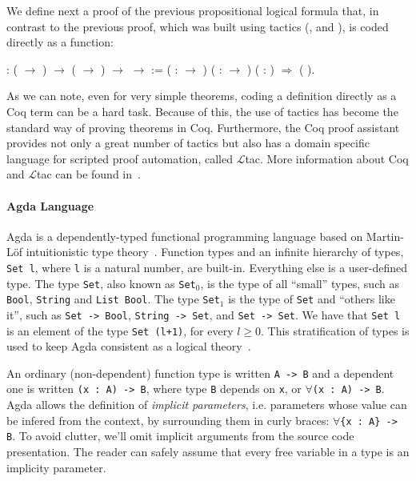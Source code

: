 We define next a proof of the previous propositional logical formula
that, in contrast to the previous proof, which was built using tactics
(,  and ), is coded
directly as a function:
 \begin{coqdoccode}
\coqdocemptyline
\coqdocnoindent
{} \coqdoceol
\coqdocindent{1.00em}
: ( \ensuremath{\rightarrow} ) \ensuremath{\rightarrow} ( \ensuremath{\rightarrow} ) \ensuremath{\rightarrow}  \ensuremath{\rightarrow}  :=\coqdoceol
\coqdocindent{1.50em}
 ( :  \ensuremath{\rightarrow} ) ( :  \ensuremath{\rightarrow} ) ( : ) \ensuremath{\Rightarrow}  ( ).\coqdoceol
\coqdocemptyline
\end{coqdoccode}
As we can note, even for very simple theorems, coding a definition directly
as a Coq term can be a hard task. Because of this, the use of tactics
has become the standard way of proving theorems in Coq. Furthermore,
the Coq proof assistant provides not only a great number of tactics
but also has a domain specific language for scripted proof automation,
called $\mathcal{L}$tac. More information about Coq and  $\mathcal{L}$tac can be found
in~\cite{Chlipala13,Bertot04}.


\paragraph{Agda Language}
Agda is a dependently-typed functional programming language based on
Martin-L\"of intuitionistic type theory~\cite{Lof98}.  Function types
and an infinite hierarchy of types, \lstinline|Set l|, where \lstinline|l| is a
natural number, are built-in. Everything else is a user-defined
type. The type \lstinline|Set|, also known as \lstinline|Set|$_0$, is the type of all
``small'' types, such as \lstinline|Bool|, \lstinline|String| and
 \lstinline|List Bool|.  The type \lstinline|Set|$_1$ is the type of \lstinline|Set|
and ``others like it'', such as \lstinline|Set -> Bool|, \lstinline|String -> Set|,
and \lstinline|Set -> Set|. We have that \lstinline|Set l| is an
element of the type \lstinline|Set (l+1)|, for every $l \geq 0$. This
stratification of types is used to keep Agda consistent as a logical
theory~\cite{Sorensen06}.


An ordinary (non-dependent) function type is written \lstinline|A -> B| and a
dependent one is written \lstinline|(x : A) -> B|, where type \lstinline|B| depends on
\lstinline|x|, or $\forall$\lstinline|(x : A) -> B|. Agda allows the definition of \emph{implicit
parameters}, i.e.  parameters whose value can be infered from the
context, by surrounding them in curly braces: $\forall$\lstinline|{x : A} -> B|. To
avoid clutter, we'll omit implicit arguments from the source code
presentation. The reader can safely assume that every free variable in
a type is an implicity parameter.


